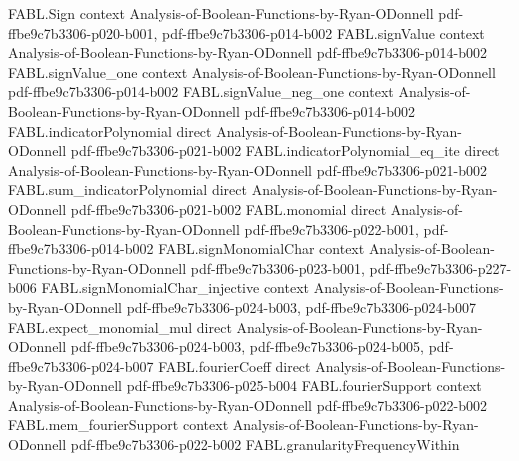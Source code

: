 \begin{theorem}
\label{FABL.influence_eq_fourierCoeff_singleton_of_monotone}
\leanok
{}
\proofstep
  {FABL.Sign}
  {context}
  {Analysis-of-Boolean-Functions-by-Ryan-ODonnell}
  {pdf-ffbe9c7b3306-p020-b001,
    pdf-ffbe9c7b3306-p014-b002}
\proofstep
  {FABL.signValue}
  {context}
  {Analysis-of-Boolean-Functions-by-Ryan-ODonnell}
  {pdf-ffbe9c7b3306-p014-b002}
\proofstep
  {FABL.signValue_one}
  {context}
  {Analysis-of-Boolean-Functions-by-Ryan-ODonnell}
  {pdf-ffbe9c7b3306-p014-b002}
\proofstep
  {FABL.signValue_neg_one}
  {context}
  {Analysis-of-Boolean-Functions-by-Ryan-ODonnell}
  {pdf-ffbe9c7b3306-p014-b002}
\proofstep
  {FABL.indicatorPolynomial}
  {direct}
  {Analysis-of-Boolean-Functions-by-Ryan-ODonnell}
  {pdf-ffbe9c7b3306-p021-b002}
\proofstep
  {FABL.indicatorPolynomial_eq_ite}
  {direct}
  {Analysis-of-Boolean-Functions-by-Ryan-ODonnell}
  {pdf-ffbe9c7b3306-p021-b002}
\proofstep
  {FABL.sum_indicatorPolynomial}
  {direct}
  {Analysis-of-Boolean-Functions-by-Ryan-ODonnell}
  {pdf-ffbe9c7b3306-p021-b002}
\proofstep
  {FABL.monomial}
  {direct}
  {Analysis-of-Boolean-Functions-by-Ryan-ODonnell}
  {pdf-ffbe9c7b3306-p022-b001,
    pdf-ffbe9c7b3306-p014-b002}
\proofstep
  {FABL.signMonomialChar}
  {context}
  {Analysis-of-Boolean-Functions-by-Ryan-ODonnell}
  {pdf-ffbe9c7b3306-p023-b001,
    pdf-ffbe9c7b3306-p227-b006}
\proofstep
  {FABL.signMonomialChar_injective}
  {context}
  {Analysis-of-Boolean-Functions-by-Ryan-ODonnell}
  {pdf-ffbe9c7b3306-p024-b003,
    pdf-ffbe9c7b3306-p024-b007}
\proofstep
  {FABL.expect_monomial_mul}
  {direct}
  {Analysis-of-Boolean-Functions-by-Ryan-ODonnell}
  {pdf-ffbe9c7b3306-p024-b003,
    pdf-ffbe9c7b3306-p024-b005,
    pdf-ffbe9c7b3306-p024-b007}
\proofstep
  {FABL.fourierCoeff}
  {direct}
  {Analysis-of-Boolean-Functions-by-Ryan-ODonnell}
  {pdf-ffbe9c7b3306-p025-b004}
\proofstep
  {FABL.fourierSupport}
  {context}
  {Analysis-of-Boolean-Functions-by-Ryan-ODonnell}
  {pdf-ffbe9c7b3306-p022-b002}
\proofstep
  {FABL.mem_fourierSupport}
  {context}
  {Analysis-of-Boolean-Functions-by-Ryan-ODonnell}
  {pdf-ffbe9c7b3306-p022-b002}
\proofstep
  {FABL.granularityFrequencyWithin}

\end{theorem}
